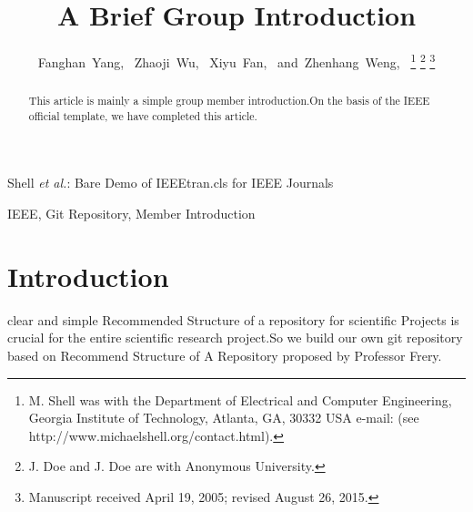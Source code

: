 \documentclass[journal]{IEEEtran}
\begin{document}
\title{A Brief Group Introduction}


\author{Fanghan~Yang,~
        Zhaoji~Wu,~
        Xiyu~Fan,~
        and~Zhenhang~Weng,~%
\thanks{M. Shell was with the Department
of Electrical and Computer Engineering, Georgia Institute of Technology, Atlanta,
GA, 30332 USA e-mail: (see http://www.michaelshell.org/contact.html).}%
\thanks{J. Doe and J. Doe are with Anonymous University.}%
\thanks{Manuscript received April 19, 2005; revised August 26, 2015.}}


%
{Shell \MakeLowercase{\textit{et al.}}: Bare Demo of IEEEtran.cls for IEEE Journals}




\maketitle

\begin{abstract}
This article is mainly a simple group member introduction.On the basis of the IEEE official template, we have completed this article.
\end{abstract}

\begin{IEEEkeywords}
IEEE, Git Repository, Member Introduction
\end{IEEEkeywords}




\IEEEpeerreviewmaketitle



\section{Introduction}

 clear and simple Recommended Structure of a repository for scientific Projects is crucial for the entire scientific research project.So we build our own git repository based on Recommend Structure of A Repository proposed by Professor Frery\cite{2020A}.
\end{document}
